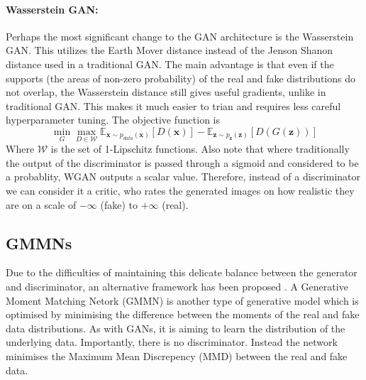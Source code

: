 \documentclass[12pt]{report}
\begin{document}
\paragraph{Wasserstein GAN:} Perhaps the most significant change to the GAN architecture is the Wasserstein GAN. This utilizes the Earth Mover distance instead of the Jenson Shanon distance used in a traditional GAN. The main advantage is that even if the supports (the areas of non-zero probability) of the real and fake distributions do not overlap, the Wasserstein distance still gives useful gradients, unlike in traditional GAN. This makes it much easier to trian and requires less careful hyperparameter tuning. The objective function is 
\begin{equation*} \min_G \max_{D \in \mathcal{W}} \mathbb{E}_{\mathbf{x} \sim p_{data}(\mathbf{x})}[D(\mathbf{x})] - \mathbb{E}_{\mathbf{z} \sim p_{\mathbf{z}}(\mathbf{z})}[D(G(\mathbf{z}))]
\end{equation*}
Where $\mathcal{W}$ is the set of 1-Lipschitz functions. Also note that where traditionally the output of the discriminator is passed through a sigmoid and considered to be a probablity, WGAN outputs a scalar value. Therefore, instead of a discriminator we can consider it a critic, who rates the generated images on how realistic they are on a scale of $-\infty$ (fake) to  $+\infty$ (real).


\subsection{GMMNs}

Due to the difficulties of maintaining this delicate balance between the generator and discriminator, an alternative framework has been proposed \citep{li2015gmmn}. A Generative Moment Matching Netork (GMMN) is another type of generative model which is optimised by minimising the difference between the moments of the real and fake data distributions.  As with GANs, it is aiming to learn the distribution of the underlying data. Importantly, there is no discriminator. Instead the network minimises the Maximum Mean Discrepency (MMD) between the real and fake data. 
\end{document}
